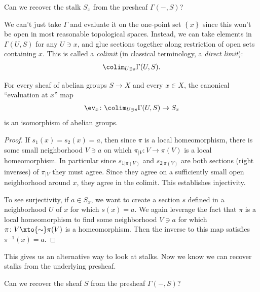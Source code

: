 \documentclass[11pt]{book}
\begin{document}
\begin{question} Can we recover the stalk $S_x$ from the presheaf $\Gamma(-,S)$?
\end{question}

We can't just take $\Gamma$ and evaluate it on the one-point set $\left\{ x \right\}$ since this won't be open in most reasonable topological spaces. Instead, we can take elements in $\Gamma(U,S)$ for any $U \ni x$, and glue sections together along restriction of open sets containing $x$. This is called a \emph{colimit} (in classical terminology, a \emph{direct limit}):
\begin{align*}
    \colim_{U\ni s}\Gamma(U,S).
\end{align*}
%
\begin{proposition}\label{prop:colimit-sections-is-stalk}
For every sheaf of abelian groups $S \to X$ and every $x\in X$, the canonical ``evaluation at $x$'' map
\begin{align*}
    \ev_x \colon \colim_{U\ni s} \Gamma(U,S) \to S_x
\end{align*}
is an isomorphism of abelian groups.
\end{proposition}
\begin{proof} If $s_1(x) = s_2(x) = a$, then since $\pi$ is a local homeomorphism, there is some small neighborhood $V \ni a$ on which $\pi_{|V} \colon V \to \pi(V)$ is a local homeomorphism. In particular since $s_{1|\pi(V)}$ and $s_{2|\pi(V)}$ are both sections (right inverses) of $\pi_{|V}$ they must agree. Since they agree on a sufficiently small open neighborhood around $x$, they agree in the colimit. This establishes injectivity.

To see surjectivity, if $a\in S_x$, we want to create a section $s$ defined in a neighborhood $U$ of $x$ for which $s(x) = a$. We again leverage the fact that $\pi$ is a local homeomorphism to find some neighborhood $V \ni a$ for which $\pi \colon V \xto{\sim} \pi(V)$ is a homeomorphism. Then the inverse to this map satisfies $\pi^{-1}(x) = a$.
\end{proof}
This gives us an alternative way to look at stalks. Now we know we can recover stalks from the underlying presheaf.

\begin{question}\label{ques:recover-sheaf-from-presheaf} 
Can we recover the sheaf $S$ from the presheaf $\Gamma(-,S)$?
\end{question}
\end{document}
